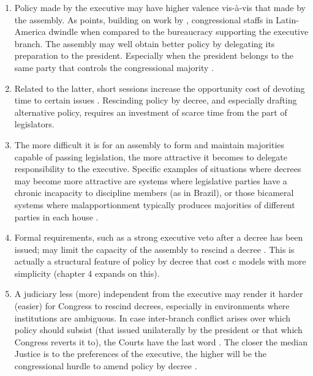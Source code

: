 \begin{enumerate}

\item Policy made by the executive may have higher valence vis-à-vis that made by the assembly.  As \citet{londregan.2000a} points, building on work by \citet{stokes.1963}, congressional staffs in Latin-America dwindle when compared to the bureaucracy supporting the executive branch.  The assembly may well obtain better policy by delegating its preparation to the president.  Especially when the president belongs to the same party that controls the congressional majority \citep{carey.shugart.1998}.

\item Related to the latter, short sessions increase the opportunity cost of devoting time to certain issues \citep{fenno.1973}.  Rescinding policy by decree, and especially drafting alternative policy, requires an investment of scarce time from the part of legislators.  

\item The more difficult it is for an assembly to form and maintain majorities capable of passing legislation, the more attractive it becomes to delegate responsibility to the executive.  Specific examples of situations where decrees may become more attractive are systems where legislative parties have a chronic incapacity to discipline members (as in Brazil), or those bicameral systems where malapportionment typically produces majorities of different parties in each house \citep[see][]{carey.shugart.1998a,cox.mccubbins.2001}.

\item Formal requirements, such as a strong executive veto after a decree has been issued; may limit the capacity of the assembly to rescind a decree \citep{carey.shugart.1998a}.  This is actually a structural feature of policy by decree that cost c models with more simplicity (chapter 4 expands on this). 
 
\item A judiciary less (more) independent from the executive may render it harder (easier) for Congress to rescind decrees, especially in environments where institutions are ambiguous.  In case inter-branch conflict arises over which policy should subsist (that issued unilaterally by the president or that which Congress reverts it to), the Courts have the last word \citep{carey.shugart.1998a}.  The closer the median Justice is to the preferences of the executive, the higher will be the congressional hurdle to amend policy by decree \citep{mcnollgast.1994}.  

\end{enumerate}

